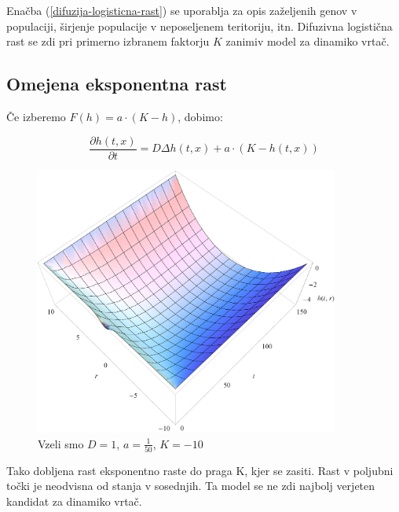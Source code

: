 \documentclass[a4paper, oneside, 12pt]{book}
\begin{document}
          Enačba (\ref{difuzija-logisticna-rast}) se uporablja za opis zaželjenih genov v populaciji, širjenje populacije v neposeljenem teritoriju, itn.
          Difuzivna logistična rast se zdi pri primerno izbranem faktorju $K$ zanimiv model za dinamiko vrtač.


          \subsection{Omejena eksponentna rast}

          Če izberemo $F(h) = a \cdot (K - h)$, dobimo:

            \begin{equation}
              \frac{ \partial h(t,x) }{ \partial t} = D \Delta h(t,x) + a \cdot (K - h(t,x))
              \label{difuzija-omejena-eksponentna-rast}
            \end{equation}

            \begin{figure}[H]
              \begin{center}
                \includegraphics[width=10cm]{slike/difuzija-omejena-eksponentna-rast2}
              \end{center}
              \caption{Vzeli smo $D=1$, $a=\frac{1}{50}$, $K=-10$}
              \label{fig:difuzija-omejena-eksponentna-rast}
            \end{figure}

          Tako dobljena rast eksponentno raste do praga K, kjer se zasiti. Rast v poljubni točki je neodvisna od stanja v sosednjih. Ta model se ne zdi najbolj verjeten kandidat za dinamiko vrtač.
\end{document}
